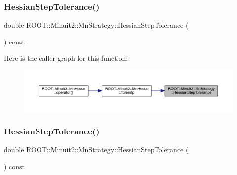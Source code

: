 \subsubsection{\texorpdfstring{HessianStepTolerance()}{HessianStepTolerance()}\hspace{0.1cm}{\footnotesize\ttfamily [1/2]}}
{\footnotesize\ttfamily double R\+O\+O\+T\+::\+Minuit2\+::\+Mn\+Strategy\+::\+Hessian\+Step\+Tolerance (\begin{DoxyParamCaption}{ }\end{DoxyParamCaption}) const\hspace{0.3cm}{\ttfamily [inline]}}

Here is the caller graph for this function\+:\nopagebreak
\begin{figure}[H]
\begin{center}
\leavevmode
\includegraphics[width=350pt]{da/de4/classROOT_1_1Minuit2_1_1MnStrategy_aaee4b3cbe14d4caa2d57fbc93b451ac2_icgraph}
\end{center}
\end{figure}
\mbox{\label{classROOT_1_1Minuit2_1_1MnStrategy_aaee4b3cbe14d4caa2d57fbc93b451ac2}} 
\subsubsection{\texorpdfstring{HessianStepTolerance()}{HessianStepTolerance()}\hspace{0.1cm}{\footnotesize\ttfamily [2/2]}}
{\footnotesize\ttfamily double R\+O\+O\+T\+::\+Minuit2\+::\+Mn\+Strategy\+::\+Hessian\+Step\+Tolerance (\begin{DoxyParamCaption}{ }\end{DoxyParamCaption}) const\hspace{0.3cm}{\ttfamily [inline]}}

\mbox{\label{classROOT_1_1Minuit2_1_1MnStrategy_a49f91ddb7327a651bc0580e644acc8fb}} 
